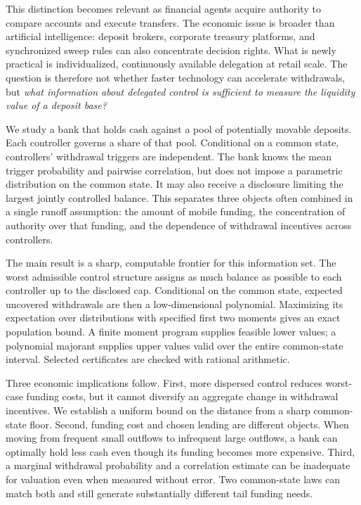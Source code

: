 \documentclass[11pt]{article}
\theoremstyle{definition}\newtheorem{definition}[theorem]{Definition}
\begin{document}
This distinction becomes relevant as financial agents acquire authority to compare accounts and execute transfers. The economic issue is broader than artificial intelligence: deposit brokers, corporate treasury platforms, and synchronized sweep rules can also concentrate decision rights. What is newly practical is individualized, continuously available delegation at retail scale. The question is therefore not whether faster technology can accelerate withdrawals, but \emph{what information about delegated control is sufficient to measure the liquidity value of a deposit base?}

We study a bank that holds cash against a pool of potentially movable deposits. Each controller governs a share of that pool. Conditional on a common state, controllers' withdrawal triggers are independent. The bank knows the mean trigger probability and pairwise correlation, but does not impose a parametric distribution on the common state. It may also receive a disclosure limiting the largest jointly controlled balance. This separates three objects often combined in a single runoff assumption: the amount of mobile funding, the concentration of authority over that funding, and the dependence of withdrawal incentives across controllers.

The main result is a sharp, computable frontier for this information set. The worst admissible control structure assigns as much balance as possible to each controller up to the disclosed cap. Conditional on the common state, expected uncovered withdrawals are then a low-dimensional polynomial. Maximizing its expectation over distributions with specified first two moments gives an exact population bound. A finite moment program supplies feasible lower values; a polynomial majorant supplies upper values valid over the entire common-state interval. Selected certificates are checked with rational arithmetic.

Three economic implications follow. First, more dispersed control reduces worst-case funding costs, but it cannot diversify an aggregate change in withdrawal incentives. We establish a uniform bound on the distance from a sharp common-state floor. Second, funding cost and chosen lending are different objects. When moving from frequent small outflows to infrequent large outflows, a bank can optimally hold less cash even though its funding becomes more expensive. Third, a marginal withdrawal probability and a correlation estimate can be inadequate for valuation even when measured without error. Two common-state laws can match both and still generate substantially different tail funding needs.
\end{document}
